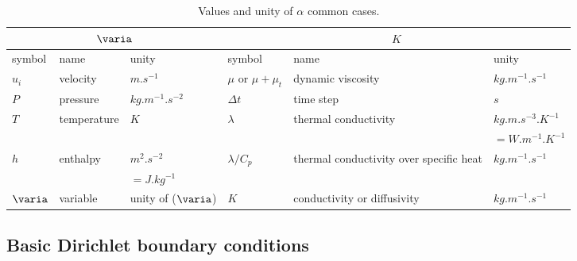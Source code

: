 \begin{table}
{\scriptsize
\begin{center}
\begin{tabular}{||l|l|l||l|l|l||}
\hline
\multicolumn{3}{||c||}{$\varia$}&\multicolumn{3}{|c||}{$K$}\\
\hline
symbol                            & name                              & unity                    &
symbol                            & name                              & unity                  \\
\hline
$u_i$                             & velocity                          & $m.s^{-1}$                &
$\mu$ or $\mu+\mu_t$              & dynamic viscosity                 & $kg.m^{-1}.s^{-1}$     \\
$P$                               & pressure                          & $kg.m^{-1}.s^{-2}$       &
$\Delta t$                     & time step                         & $s$                      \\
$T$                               & temperature                       & $K$                        &
$\lambda$                    & thermal conductivity              & $kg.m.s^{-3}.K^{-1}$ \\
                                  &                                   &                            &
                                  &                                   & $=W.m^{-1}.K^{-1}$\\
$h$                               & enthalpy                          & $m^{2}.s^{-2}$&
$\lambda/C_p$              & thermal conductivity over specific heat  & $kg.m^{-1}.s^{-1}$     \\
                                  &                                   & $=J.kg^{-1}$&
                                  &                                   &                          \\
$\varia$                     & variable                          & unity of ($\varia$)               &
$K  $                          & conductivity or diffusivity       & $kg.m^{-1}.s^{-1}$     \\
\hline
\end{tabular}
\end{center}
}
\caption{Values and unity of $\alpha$ common cases.}\label{tab:bdncnd:diffusivity}
\end{table}

\subsection{Basic Dirichlet boundary conditions}

